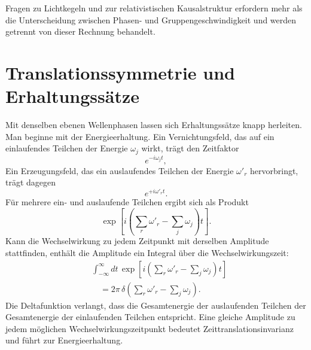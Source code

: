 \begin{classroomqa}
\end{classroomqa}

Fragen zu Lichtkegeln und zur relativistischen Kausalstruktur erfordern mehr als die Unterscheidung zwischen Phasen- und Gruppengeschwindigkeit und werden getrennt von dieser Rechnung behandelt.

\section{Translationssymmetrie und Erhaltungssätze}

Mit denselben ebenen Wellenphasen lassen sich Erhaltungssätze knapp herleiten. Man beginne mit der Energieerhaltung. Ein Vernichtungsfeld, das auf ein einlaufendes Teilchen der Energie \(\omega_j\) wirkt, trägt den Zeitfaktor
\begin{equation}
e^{-i\omega_j t},
\end{equation}
Ein Erzeugungsfeld, das ein auslaufendes Teilchen der Energie \(\omega'_r\) hervorbringt, trägt dagegen
\begin{equation}
e^{+i\omega'_r t}.
\end{equation}
Für mehrere ein- und auslaufende Teilchen ergibt sich als Produkt
\begin{equation}
\exp\!\left[
i\left(\sum_r\omega'_r-\sum_j\omega_j\right)t
\right].
\end{equation}
Kann die Wechselwirkung zu jedem Zeitpunkt mit derselben Amplitude stattfinden, enthält die Amplitude ein Integral über die Wechselwirkungszeit:
\begin{equation}
\begin{aligned}
&\int_{-\infty}^{\infty}dt\,
\exp\!\left[
i\left(\sum_r\omega'_r-\sum_j\omega_j\right)t
\right]
\\
&\quad =2\pi\,
\delta\!\left(\sum_r\omega'_r-\sum_j\omega_j\right).
\end{aligned}
\end{equation}
Die Deltafunktion verlangt, dass die Gesamtenergie der auslaufenden Teilchen der Gesamtenergie der einlaufenden Teilchen entspricht. Eine gleiche Amplitude zu jedem möglichen Wechselwirkungszeitpunkt bedeutet Zeittranslationsinvarianz und führt zur Energieerhaltung.

